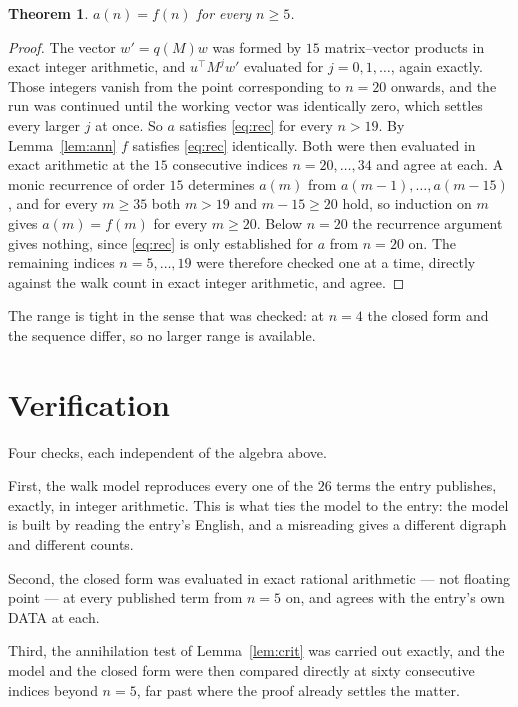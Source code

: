 \documentclass[11pt,a4paper]{article}
\theoremstyle{plain}
\newtheorem{theorem}{Theorem}
\theoremstyle{definition}
\begin{document}
\begin{theorem}
$a(n)=f(n)$ for every $n\ge5$.
\end{theorem}

\begin{proof}
The vector $w'=q(M)w$ was formed by $15$ matrix--vector products in exact integer
arithmetic, and $u^{\!\top}M^{j}w'$ evaluated for $j=0,1,\dots$, again exactly. Those integers
vanish from the point corresponding to $n=20$ onwards, and the run was continued until the
working vector was identically zero, which settles every larger $j$ at once. So $a$ satisfies
\eqref{eq:rec} for every $n>19$. By Lemma~\ref{lem:ann} $f$ satisfies \eqref{eq:rec}
identically. Both were then evaluated in exact arithmetic at the $15$ consecutive indices
$n=20,\dots,34$ and agree at each. A monic recurrence of order $15$
determines $a(m)$ from $a(m-1),\dots,a(m-15)$, and for every $m\ge35$ both
$m>19$ and $m-15\ge20$ hold, so induction on $m$ gives $a(m)=f(m)$ for every
$m\ge20$.
Below $n=20$ the recurrence argument gives nothing, since \eqref{eq:rec} is only
established for $a$ from $n=20$ on. The remaining indices $n=5,\dots,19$ were
therefore checked one at a time, directly against the walk count in exact integer arithmetic,
and agree.
\end{proof}

The range is tight in the sense that was checked: at $n=4$ the closed form and the sequence differ, so no larger range is available.

\section{Verification}

Four checks, each independent of the algebra above.

First, the walk model reproduces every one of the $26$ terms the entry publishes,
exactly, in integer arithmetic. This is what ties the model to the entry: the model is built
by reading the entry's English, and a misreading gives a different digraph and different
counts.

Second, the closed form was evaluated in exact rational arithmetic --- not floating point ---
at every published term from $n=5$ on, and agrees with the entry's own DATA at each.

Third, the annihilation test of Lemma~\ref{lem:crit} was carried out exactly, and the model
and the closed form were then compared directly at sixty consecutive indices beyond
$n=5$, far past where the proof already settles the matter.
\end{document}
